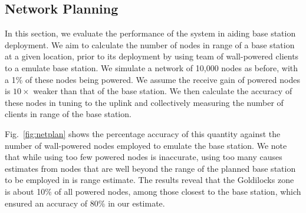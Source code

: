 \subsection{Network Planning}
In this section, we evaluate the performance of the system in aiding base station deployment. We aim to calculate the number of nodes in range of a base station at a given location, prior to its deployment by using team of wall-powered clients to a emulate base station. We simulate a network of 10,000 nodes as before, with a 1\% of these nodes being powered. We assume the receive gain of powered nodes is $10\times$ weaker than that of the base station. We then calculate the accuracy of these nodes in tuning to the uplink and collectively measuring the number of clients in range of the base station.

Fig.~\ref{fig:netplan} shows the percentage accuracy of this quantity against the number of wall-powered nodes employed to emulate the base station. We note that while using too few powered nodes is inaccurate, using too many causes estimates from nodes that are well beyond the range of the planned base station to be employed in is range estimate. The results reveal that the Goldilocks zone is about 10\% of all powered nodes, among those closest to the base station, which ensured an accuracy of 80\% in our estimate. 
